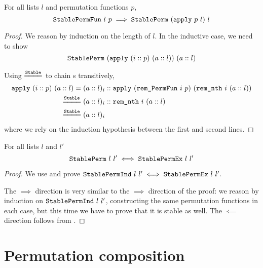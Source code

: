 \documentclass[sigplan,10pt,anonymous,review]{thesis}
\begin{document}
\begin{theorem}
  For all lists $l$ and permutation functions $p$,
  \begin{equation*}
    \texttt{StablePermFun}~l~p \implies \texttt{StablePerm}~(\texttt{apply}~p~l)~l
  \end{equation*}
\end{theorem}
\begin{proof}
  We reason by induction on the length of $l$. In the inductive case,
  we need to show
  \begin{equation*}
    \texttt{StablePerm}~(\texttt{apply}~(i :: p)~(a :: l))~(a :: l)
  \end{equation*}

  Using $\eqstable$ to chain s transitively,
  \begin{align*}
    \var{apply}~(i :: p)~(a :: l)
    ={}& (a :: l)_i  ::
    \var{apply}~(\var{rem\_PermFun}~i~p)~(\var{rem\_nth}~i~(a :: l)) \\
    \eqstable{}& (a :: l)_i :: \var{rem\_nth}~i~(a :: l) \\
    \eqstable{}& (a :: l)_i
  \end{align*}
  where we rely on the induction hypothesis between the first and
  second lines.
\end{proof}

\begin{theorem}
  For all lists $l$ and $l'$
  \begin{equation*}
    \texttt{StablePerm}~l~l' \iff \texttt{StablePermEx}~l~l'
  \end{equation*}
\end{theorem}
\begin{proof}
  We use  and prove $\texttt{StablePermInd}~l~l'
  \iff \texttt{StablePermEx}~l~l'$.

  The $\implies$ direction is very similar to the $\implies$ direction
  of the  proof: we reason by induction on
  $\texttt{StablePermInd}~l~l'$, constructing the same permutation
  functions in each case, but this time we have to prove that it is
  stable as well. The $\impliedby$ direction follows from
  .
\end{proof}


\section{Permutation composition}
\label{appendix:perm_comp}
\end{document}
